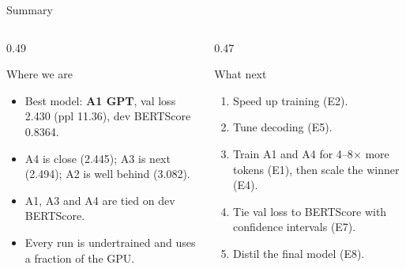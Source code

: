 \documentclass[aspectratio=169,11pt]{beamer}
\begin{document}
\begin{frame}{Summary}
  \begin{columns}[T]
    \begin{column}{0.49\textwidth}
      \begin{block}{Where we are}
        \small
        \begin{itemize}
          \item Best model: \textbf{A1 GPT}, val loss 2.430 (ppl 11.36), dev BERTScore 0.8364.
          \item A4 is close (2.445); A3 is next (2.494); A2 is well behind (3.082).
          \item A1, A3 and A4 are tied on dev BERTScore.
          \item Every run is undertrained and uses a fraction of the GPU.
        \end{itemize}
      \end{block}
    \end{column}
    \begin{column}{0.47\textwidth}
      \begin{exampleblock}{What next}
        \small
        \begin{enumerate}
          \item Speed up training (E2).
          \item Tune decoding (E5).
          \item Train A1 and A4 for 4--8$\times$ more tokens (E1), then scale the winner (E4).
          \item Tie val loss to BERTScore with confidence intervals (E7).
          \item Distil the final model (E8).
        \end{enumerate}
      \end{exampleblock}
    \end{column}
  \end{columns}
\end{frame}
\end{document}
